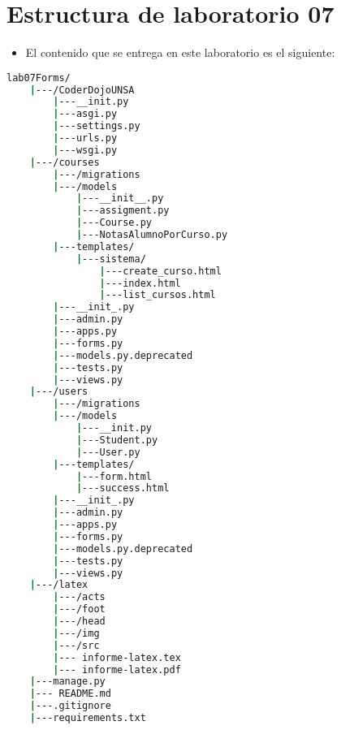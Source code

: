 \section{Estructura de laboratorio 07}
\begin{itemize}
	\item El contenido que se entrega en este laboratorio es el siguiente:
\end{itemize}
\begin{lstlisting}[language=bash]
  lab07Forms/
    |---/CoderDojoUNSA
        |---__init.py
        |---asgi.py
        |---settings.py
        |---urls.py
        |---wsgi.py
    |---/courses
        |---/migrations
        |---/models
            |---__init__.py
            |---assigment.py
            |---Course.py
            |---NotasAlumnoPorCurso.py
        |---templates/
            |---sistema/
                |---create_curso.html
                |---index.html
                |---list_cursos.html
        |---__init_.py
        |---admin.py
        |---apps.py
        |---forms.py
        |---models.py.deprecated
        |---tests.py
        |---views.py
    |---/users
        |---/migrations
        |---/models
            |---__init.py
            |---Student.py
            |---User.py
        |---templates/
            |---form.html
            |---success.html
        |---__init_.py
        |---admin.py
        |---apps.py
        |---forms.py
        |---models.py.deprecated
        |---tests.py
        |---views.py
    |---/latex
        |---/acts
        |---/foot
        |---/head
        |---/img
        |---/src
        |--- informe-latex.tex
        |--- informe-latex.pdf
    |---manage.py
    |--- README.md
    |---.gitignore
    |---requirements.txt
  \end{lstlisting}